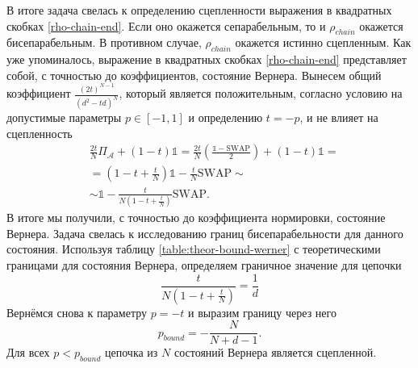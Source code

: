 В итоге задача свелась к определению сцепленности выражения в квадратных скобках \ref{rho-chain-end}.
Если оно окажется сепарабельным, то и $\rho_{chain}$ окажется бисепарабельным. В противном случае, $\rho_{chain}$ окажется истинно сцепленным.
Как уже упоминалось, выражение в квадратных скобках \ref{rho-chain-end} представляет собой, с точностью до коэффициентов, состояние Вернера. Вынесем общий коэффициент $\frac{(2t)^{N-1}}{(d^2 - td)^N}$, который является положительным, согласно условию на допустимые параметры $p\in[-1,1]$ и определению $t = -p$, и не влияет на сцепленность
\begin{equation}
\begin{split}
& \frac{2t}{N} \Pi_{\mathcal A} + (1-t)\mathbb{1} = \frac{2t}{N} \left( \frac{\mathbb{1} - \mathrm{SWAP}}{2} \right) + (1-t)\mathbb{1} = \\
& = \left( 1-t + \frac{t}{N}\right) \mathbb{1} - \frac{t}{N} \mathrm{SWAP} \sim \\
& \sim \mathbb{1} - \frac{t}{N( 1-t + \frac{t}{N})} \mathrm{SWAP}.
\end{split}
\end{equation}
В итоге мы получили, с точностью до коэффициента нормировки, состояние Вернера.
Задача свелась к исследованию границ бисепарабельности для данного состояния.
Используя таблицу \ref{table:theor-bound-werner} с теоретическими границами  для состояния Вернера, определяем граничное значение для цепочки
\begin{equation}
    \frac{t}{N( 1-t + \frac{t}{N})} = \frac{1}{d}
\end{equation}
Вернёмся снова к параметру $p = -t$ и выразим границу через него
\begin{equation}\label{sep-bound}
    p_{bound} = - \frac{N}{N + d - 1}.
\end{equation}
Для всех $p < p_{bound}$ цепочка из $N$ состояний Вернера является сцепленной.